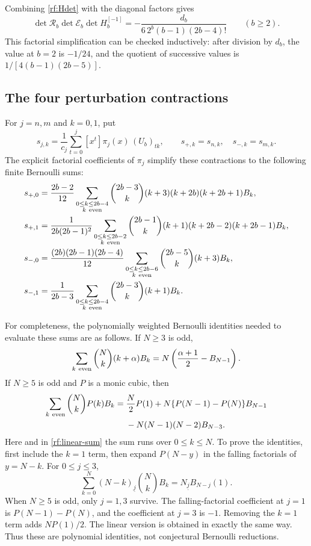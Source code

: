 Combining \eqref{rf:Hdet} with the diagonal factors gives
\begin{equation}\label{rf:base-scaled}
 \det\mathcal R_b\det\mathcal E_b\det H_b^{[-1]}
 =-\frac{d_b}{6\,2^b(b-1)(2b-4)!}\qquad(b\geq2).
\end{equation}
This factorial simplification can be checked inductively: after
division by $d_b$, the value at $b=2$ is $-1/24$, and the quotient
of successive values is $1/[4(b-1)(2b-5)]$.

\subsection{The four perturbation contractions}

For $j=n,m$ and $k=0,1$, put
\[
 s_{j,k}=\frac1{c_j}\sum_{t=0}^j[x^t]\pi_j(x)\,(U_b)_{tk},
 \qquad s_{+,k}=s_{n,k},\quad s_{-,k}=s_{m,k}.
\]
The explicit factorial coefficients of $\pi_j$ simplify these
contractions to the following finite Bernoulli sums:
\begin{align}
 s_{+,0}&=\frac{2b-2}{12}
 \sum_{\substack{0\leq k\leq2b-4\\k\ {\rm even}}}
 \binom{2b-3}{k}(k+3)(k+2b)(k+2b+1)B_k,\notag\\
 s_{+,1}&=\frac1{2b(2b-1)^2}
 \sum_{\substack{0\leq k\leq2b-2\\k\ {\rm even}}}
 \binom{2b-1}{k}(k+1)(k+2b-2)(k+2b-1)B_k,\notag\\
 s_{-,0}&=\frac{(2b)(2b-1)(2b-4)}{12}
 \sum_{\substack{0\leq k\leq2b-6\\k\ {\rm even}}}
 \binom{2b-5}{k}(k+3)B_k,\notag\\
 s_{-,1}&=\frac1{2b-3}
 \sum_{\substack{0\leq k\leq2b-4\\k\ {\rm even}}}
 \binom{2b-3}{k}(k+1)B_k.
 \label{rf:finite-sums}
\end{align}

For completeness, the polynomially weighted Bernoulli identities
needed to evaluate these sums are as follows.  If $N\geq3$ is odd,
\begin{equation}\label{rf:linear-sum}
 \sum_{k\ {\rm even}}\binom Nk(k+\alpha)B_k
 =N\left(\frac{\alpha+1}{2}-B_{N-1}\right).
\end{equation}
If $N\geq5$ is odd and $P$ is a monic cubic, then
\begin{align}
 \sum_{k\ {\rm even}}\binom NkP(k)B_k
 ={}&\frac N2P(1)
   +N\{P(N-1)-P(N)\}B_{N-1}\notag\\
 &-N(N-1)(N-2)B_{N-3}.
 \label{rf:cubic-sum}
\end{align}
Here and in \eqref{rf:linear-sum} the sum runs over $0\leq k\leq N$.
To prove the identities, first include the $k=1$ term, then expand
$P(N-y)$ in the falling factorials of $y=N-k$.  For $0\leq j\leq3$,
\[
 \sum_{k=0}^N(N-k)_{\underline j}\binom NkB_k
 =N_{\underline j}B_{N-j}(1).
\]
When $N\geq5$ is odd, only $j=1,3$ survive.  The falling-factorial
coefficient at $j=1$ is $P(N-1)-P(N)$, and the coefficient at
$j=3$ is $-1$.  Removing the $k=1$ term adds $NP(1)/2$.
The linear version is obtained in exactly the same way.  Thus these
are polynomial identities, not conjectural Bernoulli reductions.

